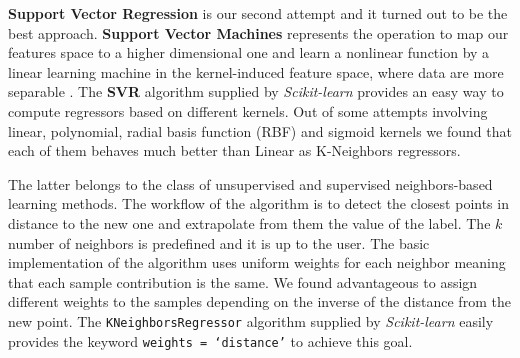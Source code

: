 \textbf{Support Vector Regression} is our second attempt and it turned out to be the best approach.
\textbf{Support Vector Machines} represents the operation to map our features space to a higher dimensional one and learn a nonlinear function by a linear learning machine in the kernel-induced feature space, where data are more separable \cite{yang2008regression}.
The \textbf{SVR} algorithm supplied by \textit{Scikit-learn} provides an easy way to compute regressors based on different kernels.
Out of some attempts involving linear, polynomial, radial basis function (RBF) and sigmoid kernels we found that each of them behaves much better than Linear as K-Neighbors regressors.

The latter belongs to the class of unsupervised and supervised neighbors-based learning methods.
The workflow of the algorithm is to detect the closest points in distance to the new one and extrapolate from them the value of the label.
The $k$ number of neighbors is predefined and it is up to the user.
The basic implementation of the algorithm uses uniform weights for each neighbor meaning that each sample contribution is the same.
We found advantageous to assign different weights to the samples depending on the inverse of the distance from the new point.
The \texttt{KNeighborsRegressor} algorithm supplied by \textit{Scikit-learn} easily provides the keyword \texttt{weights = `distance'} to achieve this goal.

